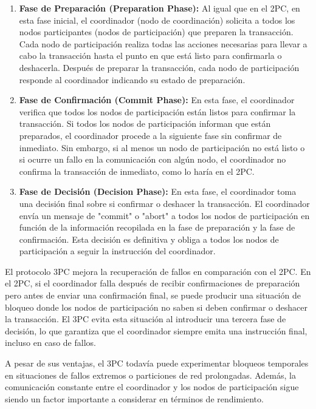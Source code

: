 \begin{enumerate}
	\item \textbf{Fase de Preparación (Preparation Phase):} Al igual que en el 2PC, en esta fase inicial, el coordinador (nodo de coordinación) solicita a todos los nodos participantes (nodos de participación) que preparen la transacción. Cada nodo de participación realiza todas las acciones necesarias para llevar a cabo la transacción hasta el punto en que está listo para confirmarla o deshacerla. Después de preparar la transacción, cada nodo de participación responde al coordinador indicando su estado de preparación.
	\item \textbf{Fase de Confirmación (Commit Phase):} En esta fase, el coordinador verifica que todos los nodos de participación están listos para confirmar la transacción. Si todos los nodos de participación informan que están preparados, el coordinador procede a la siguiente fase sin confirmar de inmediato. Sin embargo, si al menos un nodo de participación no está listo o si ocurre un fallo en la comunicación con algún nodo, el coordinador no confirma la transacción de inmediato, como lo haría en el 2PC.
	\item \textbf{Fase de Decisión (Decision Phase):} En esta fase, el coordinador toma una decisión final sobre si confirmar o deshacer la transacción. El coordinador envía un mensaje de "commit" o "abort" a todos los nodos de participación en función de la información recopilada en la fase de preparación y la fase de confirmación. Esta decisión es definitiva y obliga a todos los nodos de participación a seguir la instrucción del coordinador.
\end{enumerate}
El protocolo 3PC mejora la recuperación de fallos en comparación con el 2PC. En el 2PC, si el coordinador falla después de recibir confirmaciones de preparación pero antes de enviar una confirmación final, se puede producir una situación de bloqueo donde los nodos de participación no saben si deben confirmar o deshacer la transacción. El 3PC evita esta situación al introducir una tercera fase de decisión, lo que garantiza que el coordinador siempre emita una instrucción final, incluso en caso de fallos.

A pesar de sus ventajas, el 3PC todavía puede experimentar bloqueos temporales en situaciones de fallos extremos o particiones de red prolongadas. Además, la comunicación constante entre el coordinador y los nodos de participación sigue siendo un factor importante a considerar en términos de rendimiento.

